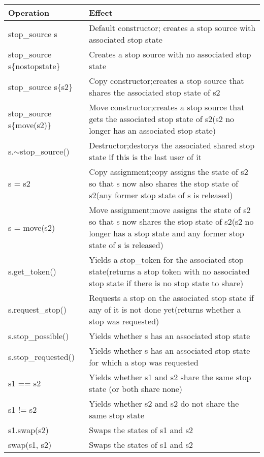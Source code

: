 \begin{longtable}[c]{|l|l|}
\hline
\textbf{Operation}            & \textbf{Effect}                                                                     \\ \hline
\endfirsthead
%
\endhead
%
stop\_source s                & Default constructor; creates a stop source with associated stop state               \\ \hline
stop\_source s\{nostopstate\} & Creates a stop source with no associated stop state                                 \\ \hline
stop\_source s\{s2\}          & Copy constructor;creates a stop source that shares the associated stop state of s2  \\ \hline
stop\_source s\{move(s2)\} &
Move constructor;creates a stop source that gets the associated stop state of s2(s2 no longer has an associated stop state) \\ \hline
s.$\sim$stop\_source()        & Destructor;destorys the associated shared stop state if this is the last user of it \\ \hline
s = s2 &
Copy assignment;copy assigns the state of s2 so that s now also shares the stop state of s2(any former stop state of s is released) \\ \hline
s = move(s2) &
Move assignment;move assigns the state of s2 so that s now shares the stop state of s2(s2 no longer has a stop state and any former stop state of s is released) \\ \hline
s.get\_token() &
Yields a stop\_token for the associated stop state(returns a stop token with no associated stop state if there is no stop state to share) \\ \hline
s.request\_stop() &
Requests a stop on the associated stop state if any of it is not done yet(returns whether a stop was requested) \\ \hline
s.stop\_possible()            & Yields whether s has an associated stop state                                       \\ \hline
s.stop\_requested()           & Yields whether s has an associated stop state for which a stop was requested        \\ \hline
s1 == s2                      & Yields whether s1 and s2 share the same stop state (or both share none)             \\ \hline
s1 != s2                      & Yields whether s2 and s2 do not share the same stop state                           \\ \hline
s1.swap(s2)                   & Swaps the states of s1 and s2                                                       \\ \hline
swap(s1, s2)                  & Swaps the states of s1 and s2                                                       \\ \hline
\end{longtable}

